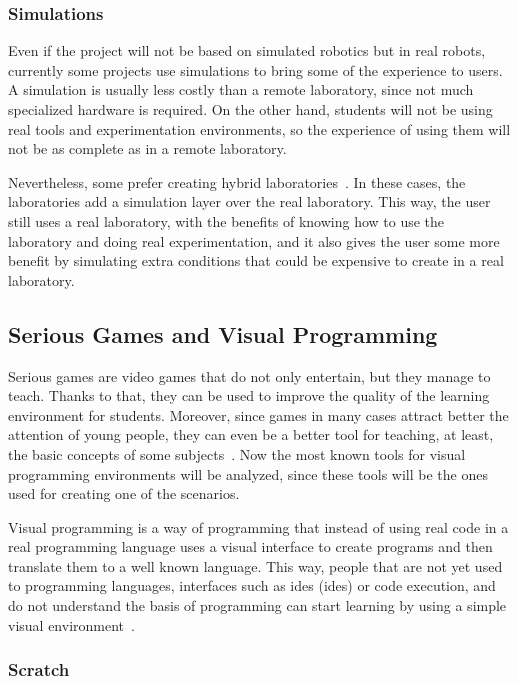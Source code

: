 \subsubsection{Simulations}

Even if the project will not be based on simulated robotics but in real robots, currently some
projects use simulations to bring some of the experience to users. A simulation is usually less
costly than a remote laboratory, since not much specialized hardware is required. On the other hand,
students will not be using real tools and experimentation environments, so the experience of using
them will not be as complete as in a remote laboratory.

Nevertheless, some prefer creating hybrid laboratories~\cite{hybrid_labs}. In these cases, the
laboratories add a simulation layer over the real laboratory. This way, the user still uses a real
laboratory, with the benefits of knowing how to use the laboratory and doing real experimentation,
and it also gives the user some more benefit by simulating extra conditions that could be expensive
to create in a real laboratory.

\subsection{Serious Games and Visual Programming}

Serious games are video games that do not only entertain, but they manage to teach. Thanks to that,
they can be used to improve the quality of the learning environment for students. Moreover, since
games in many cases attract better the attention of young people, they can even be a better tool for
teaching, at least, the basic concepts of some subjects~\cite{serious_games}. Now the most known
tools for visual programming environments will be analyzed, since these tools will be the ones used
for creating one of the scenarios.


Visual programming is a way of programming that instead of using real code in a real programming
language uses a visual interface to create programs and then translate them to a well known
language. This way, people that are not yet used to programming languages, interfaces such as
\acrshort{ide}s (\acrlong{ide}s) or code execution, and do not understand the basis of programming
can start learning by using a simple visual environment~\cite{visual_programming}.

\subsubsection{Scratch}

